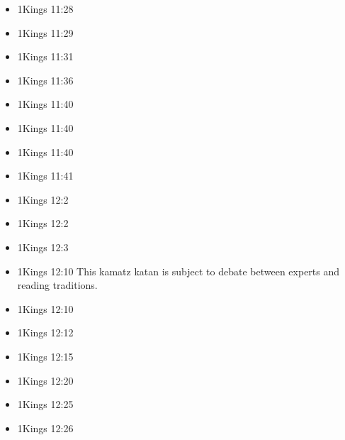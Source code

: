 \documentclass[14pt]{article}
\begin{document}
\begin{multicols}{2}
\begin{itemize}
											\item 1Kings 11:28
											
											\item 1Kings 11:29
											
											\item 1Kings 11:31
											
											\item 1Kings 11:36
											
											\item 1Kings 11:40
											
											\item 1Kings 11:40
											
											\item 1Kings 11:40
											
											\item 1Kings 11:41
											
											\item 1Kings 12:2
											
											\item 1Kings 12:2
											
											\item 1Kings 12:3
											
											\item 1Kings 12:10 This kamatz katan is subject to debate between experts and reading traditions.
											
											\item 1Kings 12:10
											
											\item 1Kings 12:12
											
											\item 1Kings 12:15
											
											\item 1Kings 12:20
											
											\item 1Kings 12:25
											
											\item 1Kings 12:26
											

\end{itemize}
\end{multicols}
\end{document}
